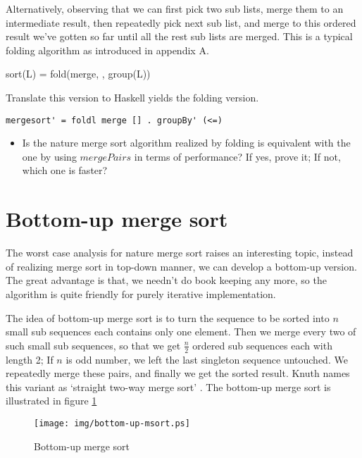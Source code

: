 \documentclass[UTF8]{article}
\begin{document}
Alternatively, observing that we can first pick two sub lists, merge them to an intermediate result, then repeatedly
pick next sub list, and merge to this ordered result we've gotten so far until all the rest sub lists are merged.
This is a typical folding algorithm as introduced in appendix A.

\be
sort(L) = fold(merge, \Phi, group(L))
\ee

Translate this version to Haskell yields the folding version.

\lstset{language=Haskell}
\begin{lstlisting}
mergesort' = foldl merge [] . groupBy' (<=)
\end{lstlisting}

\begin{Exercise}
\begin{itemize}
  \item Is the nature merge sort algorithm realized by folding is equivalent with the one by using $mergePairs$ in terms
of performance? If yes, prove it; If not, which one is faster?
\end{itemize}
\end{Exercise}

\section{Bottom-up merge sort}
The worst case analysis for nature merge sort raises an interesting topic, instead of realizing merge sort in
top-down manner, we can develop a bottom-up version. The great advantage is that, we needn't do book keeping
any more, so the algorithm is quite friendly for purely iterative implementation.

The idea of bottom-up merge sort is to turn the sequence to be sorted into $n$ small sub sequences each contains
only one element. Then we merge every two of such small sub sequences, so that we get $\frac{n}{2}$ ordered
sub sequences each with length 2; If $n$ is odd number, we left the last singleton sequence untouched.
We repeatedly merge these pairs, and finally we get the sorted result. Knuth names this variant as
`straight two-way merge sort' \cite{TAOCP}. The bottom-up merge sort is illustrated in figure \ref{fig:bottom-up-msort}

\begin{figure}[htbp]
 \centering
 \texttt{[image: img/bottom-up-msort.ps]}
 \caption{Bottom-up merge sort}
 \label{fig:bottom-up-msort}
\end{figure}
\end{document}
